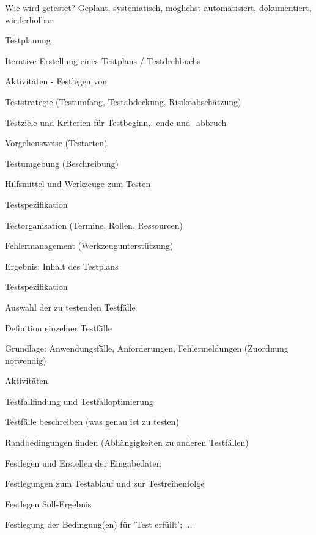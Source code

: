 \documentclass[a4paper]{article}
\begin{document}
\begin{multicols}{3}
  Wie wird getestet? Geplant, systematisch, möglichst automatisiert, dokumentiert, wiederholbar

  Testplanung
  \begin{itemize*}
    \item Iterative Erstellung eines Testplans / Testdrehbuchs
    \item Aktivitäten - Festlegen von
    \begin{itemize*}
      \item Teststrategie (Testumfang, Testabdeckung, Risikoabschätzung)
      \item Testziele und Kriterien für Testbeginn, -ende und -abbruch
      \item Vorgehensweise (Testarten)
      \item Testumgebung (Beschreibung)
      \item Hilfsmittel und Werkzeuge zum Testen
      \item Testspezifikation
      \item Testorganisation (Termine, Rollen, Ressourcen)
      \item Fehlermanagement (Werkzeugunterstützung)
    \end{itemize*}
    \item Ergebnis: Inhalt des Testplans
  \end{itemize*}

  Testspezifikation
  \begin{itemize*}
    \item Auswahl der zu testenden Testfälle
    \item Definition einzelner Testfälle
    \begin{itemize*}
      \item Grundlage: Anwendungsfälle, Anforderungen, Fehlermeldungen (Zuordnung notwendig)
    \end{itemize*}
    \item Aktivitäten
    \begin{itemize*}
      \item Testfallfindung und Testfalloptimierung
      \item Testfälle beschreiben (was genau ist zu testen)
      \item Randbedingungen finden (Abhängigkeiten zu anderen Testfällen)
      \item Festlegen und Erstellen der Eingabedaten
      \item Festlegungen zum Testablauf und zur Testreihenfolge
      \item Festlegen Soll-Ergebnis
      \item Festlegung der Bedingung(en) für 'Test erfüllt'; ...
    \end{itemize*}
  \end{itemize*}


\end{multicols}
\end{document}
